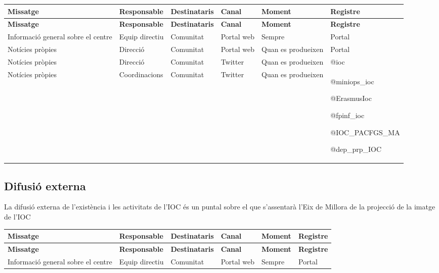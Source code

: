 \documentclass[fontsize=10pt,%
paper=a4,%
DIV=14,%
twoside,%
pagesize=auto,%
parskip=half,
captions=tableheading,%
numbers=noenddot,%
toc=graduated%
]{scrartcl}
\renewcommand{\arraystretch}{1.75}%
\renewcommand{\arraystretch}{1.75}%
\begin{document}
\begin{center}
\small
\setlength{\tabcolsep}{10pt}
\renewcommand{\arraystretch}{1.5}
\begin{longtable}{p{3cm}p{2cm}p{2cm}p{1.5cm}p{3cm}p{1.5cm}}
\hline
\textbf{Missatge}  & \textbf{Responsable} & \textbf{Destinataris} & \textbf{Canal} & \textbf{Moment} & \textbf{Registre}\\
\hline \endfirsthead
\hline
\textbf{Missatge}  & \textbf{Responsable} & \textbf{Destinataris} & \textbf{Canal} & \textbf{Moment} & \textbf{Registre}\\
\hline \endhead
Informació general sobre el centre & Equip directiu & Comunitat & Portal web & Sempre & Portal\\
Notícies pròpies & Direcció & Comunitat & Portal web & Quan es produeixen & Portal\\
Notícies pròpies & Direcció & Comunitat & Twitter & Quan es produeixen & @ioc\\
Notícies pròpies & Coordinacions & Comunitat & Twitter & Quan es produeixen & @miniops\_ioc

@ErasmusIoc

@fpinf\_ioc

@IOC\_PACFGS\_MA

@dep\_prp\_IOC\\
\end{longtable}
\end{center}

\subsection{Difusió externa}

La difusió externa de l'existència i les activitats de l'IOC és un puntal sobre el que s'assentarà l'Eix de Millora de la projecció de la imatge de l'IOC

\begin{center}
\small
\setlength{\tabcolsep}{10pt}
\renewcommand{\arraystretch}{1.5}
\begin{longtable}{p{3cm}p{2cm}p{2cm}p{1.5cm}p{3cm}p{1.5cm}}
\hline
\textbf{Missatge}  & \textbf{Responsable} & \textbf{Destinataris} & \textbf{Canal} & \textbf{Moment} & \textbf{Registre}\\
\hline \endfirsthead
\hline
\textbf{Missatge}  & \textbf{Responsable} & \textbf{Destinataris} & \textbf{Canal} & \textbf{Moment} & \textbf{Registre}\\
\hline \endhead
Informació general sobre el centre & Equip directiu & Comunitat & Portal web & Sempre & Portal\\

\end{longtable}
\end{center}
\end{document}
